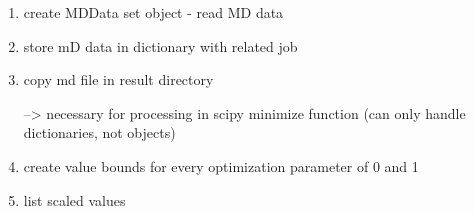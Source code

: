 \begin{enumerate}
        \item create MDData set object
            - read MD data 
        \item store mD data in dictionary with related job
        \item copy md file in result directory

        --> necessary for processing in scipy minimize function (can only handle dictionaries, not objects)

        \item create value bounds for every optimization parameter of 0 and 1
        \item list scaled values 
            
    \end{enumerate}
